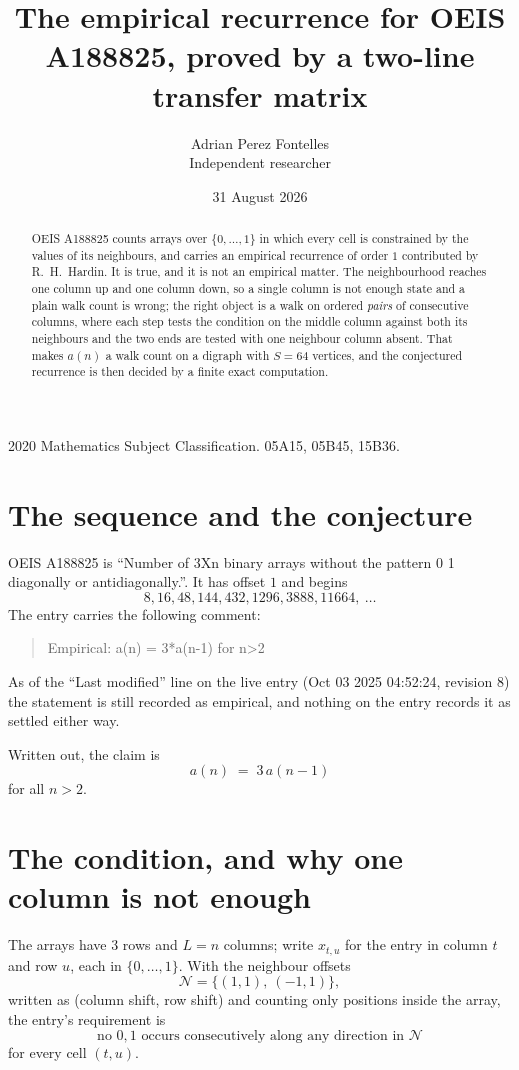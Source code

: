 \documentclass[11pt,a4paper]{article}
\title{The empirical recurrence for OEIS A188825, proved by a two-line transfer matrix}
\author{Adrian Perez Fontelles\\ \small Independent researcher}
\date{31 August 2026}
\theoremstyle{plain}
\theoremstyle{definition}
\begin{document}
\maketitle

\begin{abstract}
OEIS A188825 counts arrays over $\{0,\dots,1\}$ in which every cell is constrained by the
values of its neighbours, and carries an empirical recurrence of order $1$ contributed
by R.~H.~Hardin. It is true, and it is not an empirical matter. The neighbourhood reaches one
column up and one column down, so a single column is not enough state and a plain walk count
is wrong; the right object is a walk on ordered \emph{pairs} of consecutive columns, where
each step tests the condition on the middle column against both its neighbours and the two
ends are tested with one neighbour column absent. That makes $a(n)$ a walk count on a digraph
with $S=64$ vertices, and the conjectured recurrence is then decided by a finite exact
computation.
\end{abstract}

\noindent\small 2020 Mathematics Subject Classification. 05A15, 05B45, 15B36.\normalsize

\section{The sequence and the conjecture}

OEIS A188825 is ``Number of 3Xn binary arrays without the pattern 0 1 diagonally or antidiagonally.''. It has offset $1$ and begins
\[
8, 16, 48, 144, 432, 1296, 3888, 11664,\ \dots
\]
The entry carries the following comment:
\begin{quote}\small
Empirical: a(n) = 3*a(n-1) for n>2
\end{quote}
As of the ``Last modified'' line on the live entry (Oct 03 2025 04:52:24, revision 8) the statement is
still recorded as empirical, and nothing on the entry records it as settled either way.

Written out, the claim is
\begin{equation}\label{eq:conj}
a(n)\;=\;3\,a(n-1)
\end{equation}
for all $n>2$.

\section{The condition, and why one column is not enough}

The arrays have $3$ rows and $L=n$ columns; write $x_{t,u}$ for the entry in
column $t$ and row $u$, each in $\{0,\dots,1\}$. With the neighbour offsets
\[
\mathcal N=\{(1,1),\ (-1,1)\},
\]
written as (column shift, row shift) and counting only positions inside the array, the
entry's requirement is
\begin{equation}\label{eq:loc}
\text{no }0,1\text{ occurs consecutively along any direction in }\mathcal N
\end{equation}
for every cell $(t,u)$.
\end{document}
